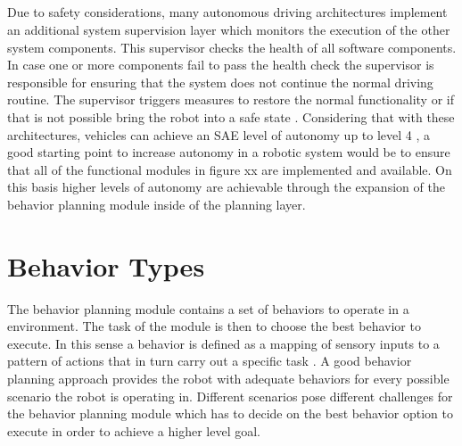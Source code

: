\subparagraph*{}
Due to safety considerations, many autonomous driving architectures implement an additional system supervision layer which monitors the execution of the other system components. This supervisor checks the health of all software components. In case one or more components fail to pass the health check the supervisor is responsible for ensuring that the system does not continue the normal driving routine. The supervisor triggers measures to restore the normal functionality or if that is not possible bring the robot into a safe state \cite{zimmermann2020adaptive}. 
Considering that with these architectures, vehicles can achieve an SAE level of autonomy up to level 4 \cite{bacha2008odin},  a good starting point to increase autonomy in a robotic system would be to ensure that all of the functional modules in figure xx are implemented and available. On this basis higher levels of autonomy are achievable through the expansion of the behavior planning module inside of the planning layer. 


\section{Behavior Types}

The behavior planning module contains a set of behaviors to operate in a environment. The task of the module is then to choose the best behavior to execute. In this sense a behavior is defined as a mapping of sensory inputs to a pattern of actions that in turn carry out a specific task \cite{murphy2000}. A good behavior planning approach provides the robot with adequate behaviors for every possible scenario the robot is operating in. Different scenarios pose different challenges for the behavior planning module which has to decide on the best behavior option to execute in order to achieve a higher level goal. 

